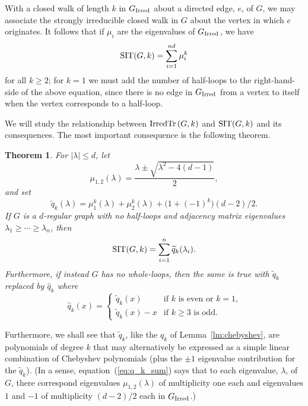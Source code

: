 \documentclass[12pt]{article}
\newtheorem{theorem}{Theorem}[section]
\newcommand{\sit}{{\rm SIT}}
\newcommand{\irdtr}[2]{{\rm IrredTr}\left(#1,#2\right)}
\newcommand{\ird}[1]{{\rm Irred}_{#1}}
\begin{document}
With a closed walk of length $k$ in $G_{\ird{}}$ about a directed edge, $e$, of 
$G$, we may associate the strongly irreducible closed walk in $G$ about the vertex
in which $e$ originates.  It follows that if $\mu_i$ are the eigenvalues
of $G_{\ird{}}$, we have 
\begin{equation}\label{eq:SIT_sum}
\sit(G,k) = \sum_{i=1}^{nd} \mu_i^k
\end{equation}
for all $k\ge 2$; for $k=1$ we must add the number of half-loops to the
right-hand-side of the above equation, since there is no edge in
$G_{\ird{}}$ from a vertex to itself when the vertex corresponds to a
half-loop.

We will study the relationship between $\irdtr{G}{k}$ and $\sit(G,k)$
and its consequences.  The most important consequence is the following
theorem.
\begin{theorem}\label{th:strongtrace}
For $|\lambda|\le d$, let
$$
\mu_{1,2}(\lambda) = \frac{\lambda\pm\sqrt{\lambda^2-4(d-1)}}{2},
$$
and set
\begin{equation}\label{eq:tilde_q}
\widetilde q_k(\lambda)=\mu_1^k(\lambda)+\mu_2^k(\lambda)+
\bigl( 1+(-1)^k \bigr)(d-2)/2.
\end{equation}
If $G$ is a $d$-regular graph with no half-loops and
adjacency matrix eigenvalues $\lambda_1\ge\cdots\ge\lambda_n$,
then
\begin{equation}\label{eq:q_k_sum}
\sit(G,k) = \sum_{i=1}^n \widetilde q_k(\lambda_i).
\end{equation}
Furthermore, if instead $G$ has no whole-loops, then the same is
true with $\widetilde q_k$ replaced by $\widehat q_k$ where
$$
\widehat q_k(x) = \left\{ \begin{array}{ll}\widetilde q_k(x)&
\mbox{if $k$ is even or $k=1$,} \\ \widetilde q_k(x)-x&
\mbox{if $k\ge 3$ is odd.}\end{array}\right.
$$
\end{theorem}
Furthermore, we shall see that $\widetilde q_k$, like the $q_k$
of Lemma~\ref{lm:chebyshev}, are polynomials of degree $k$ that may
alternatively be expressed as a simple linear combination of
Chebyshev polynomials (plus the $\pm 1$ eigenvalue contribution for
the $\widetilde q_k$).
(In a sense, equation~(\ref{eq:q_k_sum}) says that
to each eigenvalue, $\lambda$, of $G$, there correspond
eigenvalues $\mu_{1,2}(\lambda)$ of multiplicity one each and eigenvalues
$1$ and $-1$ of multiplicity $(d-2)/2$ each in $G_{\ird{}}$.)
\end{document}
